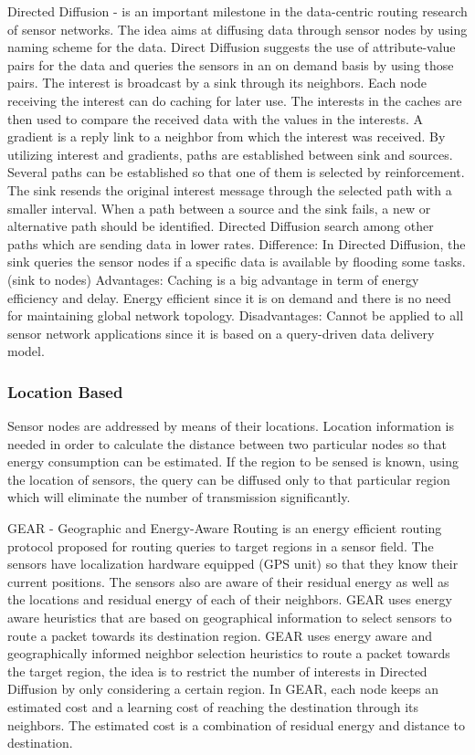 Directed Diffusion - is an important milestone in the data-centric routing research of sensor networks. The idea aims at diffusing data through sensor nodes by using naming scheme for the data. Direct Diffusion suggests the use of attribute-value pairs for the data and queries the sensors in an on demand basis by using those pairs. The interest is broadcast by a sink through its neighbors. Each node receiving the interest can do caching for later use. The interests in the caches are then used to compare the received data with the values in the interests. A gradient is a reply link to a neighbor from which the interest was received. By utilizing interest and gradients, paths are established between sink and sources. Several paths can be established so that one of them is selected by reinforcement. The sink resends the original interest message through the selected path with a smaller interval. When a path between a source and the sink fails, a new or alternative path should be identified. Directed Diffusion search among other paths which are sending data in lower rates. 
Difference: In Directed Diffusion, the sink queries the sensor nodes if a specific data is available by flooding some tasks. (sink to nodes)
Advantages: Caching is a big advantage in term of energy efficiency and delay. Energy efficient since it is on demand and there is no need for maintaining global network topology.
Disadvantages: Cannot be applied to all sensor network applications since it is based on a query-driven data delivery model.

\subsubsection{Location Based}
Sensor nodes are addressed by means of their locations. Location information is needed in order to calculate the distance between two particular nodes so that energy consumption can be estimated. If the region to be sensed is known, using the location of sensors, the query can be diffused only to that particular region which will eliminate the number of transmission significantly. 

GEAR \cite{gear}- Geographic and Energy-Aware Routing is an energy efficient routing protocol proposed for routing queries to target regions in a sensor field. The sensors have localization hardware equipped (GPS unit) so that they know their current positions. The sensors also are aware of their residual energy as well as the locations and residual energy of each of their neighbors. GEAR uses energy aware heuristics that are based on geographical information to select sensors to route a packet towards its destination region. GEAR uses energy aware and geographically informed neighbor selection heuristics to route a packet towards the target region, the idea is to restrict the number of interests in Directed Diffusion by only considering a certain region. In GEAR, each node keeps an estimated cost and a learning cost of reaching the destination through its neighbors. The estimated cost is a combination of residual energy and distance to destination.

